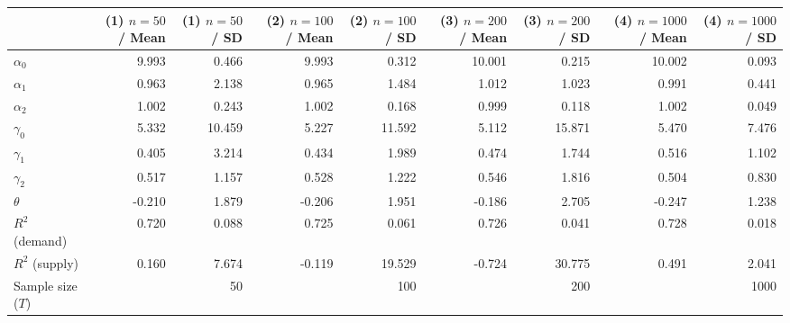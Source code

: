 
\begin{tabular}[t]{lrrrrrrrr}
\toprule
  & (1) $n=50$ / Mean & (1) $n=50$ / SD & (2) $n=100$ / Mean & (2) $n=100$ / SD & (3) $n=200$ / Mean & (3) $n=200$ / SD & (4) $n=1000$ / Mean & (4) $n=1000$ / SD\\
\midrule
$\alpha_{0}$ & 9.993 & 0.466 & 9.993 & 0.312 & 10.001 & 0.215 & 10.002 & 0.093\\
$\alpha_{1}$ & 0.963 & 2.138 & 0.965 & 1.484 & 1.012 & 1.023 & 0.991 & 0.441\\
$\alpha_{2}$ & 1.002 & 0.243 & 1.002 & 0.168 & 0.999 & 0.118 & 1.002 & 0.049\\
$\gamma_{0}$ & 5.332 & 10.459 & 5.227 & 11.592 & 5.112 & 15.871 & 5.470 & 7.476\\
$\gamma_{1}$ & 0.405 & 3.214 & 0.434 & 1.989 & 0.474 & 1.744 & 0.516 & 1.102\\
$\gamma_{2}$ & 0.517 & 1.157 & 0.528 & 1.222 & 0.546 & 1.816 & 0.504 & 0.830\\
$\theta$ & -0.210 & 1.879 & -0.206 & 1.951 & -0.186 & 2.705 & -0.247 & 1.238\\
$R^{2}$ (demand) & 0.720 & 0.088 & 0.725 & 0.061 & 0.726 & 0.041 & 0.728 & 0.018\\
$R^{2}$ (supply) & 0.160 & 7.674 & -0.119 & 19.529 & -0.724 & 30.775 & 0.491 & 2.041\\
Sample size ($T$) &  & 50 &  & 100 &  & 200 &  & 1000\\
\bottomrule
\end{tabular}
